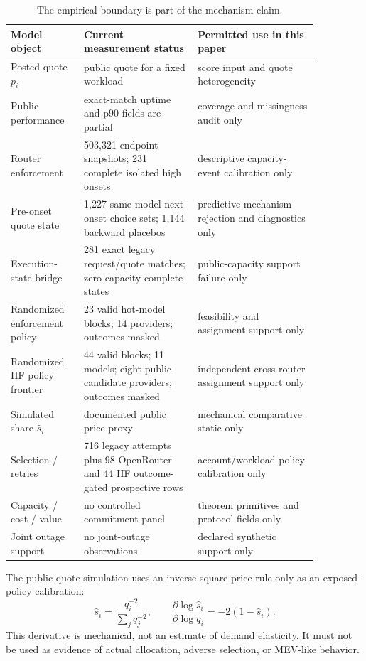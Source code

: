 \documentclass[11pt]{article}
\theoremstyle{definition}
\begin{document}
\begin{table}[t]
\centering
\footnotesize
\begin{tabular}{p{0.20\linewidth}p{0.32\linewidth}p{0.34\linewidth}}
\toprule
Model object & Current measurement status & Permitted use in this paper \\
\midrule
Posted quote $p_i$ & public quote for a fixed workload & score input and quote heterogeneity \\
Public performance & exact-match uptime and p90 fields are partial & coverage and missingness audit only \\
Router enforcement & 503,321 endpoint snapshots; 231 complete isolated high onsets & descriptive capacity-event calibration only \\
Pre-onset quote state & 1,227 same-model next-onset choice sets; 1,144 backward placebos & predictive mechanism rejection and diagnostics only \\
Execution-state bridge & 281 exact legacy request/quote matches; zero capacity-complete states & public-capacity support failure only \\
Randomized enforcement policy & 23 valid hot-model blocks; 14 providers; outcomes masked & feasibility and assignment support only \\
Randomized HF policy frontier & 44 valid blocks; 11 models; eight public candidate providers; outcomes masked & independent cross-router assignment support only \\
Simulated share $\hat s_i$ & documented public price proxy & mechanical comparative static only \\
Selection / retries & 716 legacy attempts plus 98 OpenRouter and 44 HF outcome-gated prospective rows & account/workload policy calibration only \\
Capacity / cost / value & no controlled commitment panel & theorem primitives and protocol fields only \\
Joint outage support & no joint-outage observations & declared synthetic support only \\
\bottomrule
\end{tabular}
\caption{The empirical boundary is part of the mechanism claim.}
\label{tab:empiricalboundary}
\end{table}

The public quote simulation uses an inverse-square price rule only as an
exposed-policy calibration:
\[
  \hat s_i=\frac{q_i^{-2}}{\sum_jq_j^{-2}},\qquad
  \frac{\partial\log\hat s_i}{\partial\log q_i}=-2(1-\hat s_i).
\]
This derivative is mechanical, not an estimate of demand elasticity. It must
not be used as evidence of actual allocation, adverse selection, or
MEV-like behavior.
\end{document}
